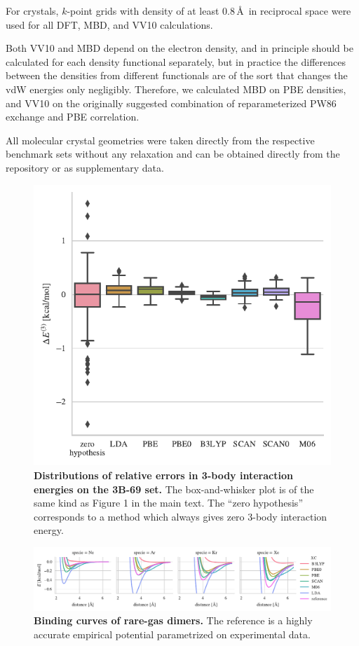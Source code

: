 \documentclass[twocolumn]{article}
\begin{document}
For crystals, $k$-point grids with density of at least 0.8\,\AA\ in reciprocal space were used for all DFT, MBD, and VV10 calculations.

Both VV10 and MBD depend on the electron density, and in principle should be calculated for each density functional separately, but in practice the differences between the densities from different functionals are of the sort that changes the vdW energies only negligibly.
Therefore, we calculated MBD on PBE densities, and VV10 on the originally suggested combination of reparameterized PW86 exchange and PBE correlation.

All molecular crystal geometries were taken directly from the respective benchmark sets without any relaxation and can be obtained directly from the repository or as supplementary data.

\begin{figure}
\includegraphics[center]{../media/3-body}
\caption{\textbf{Distributions of relative errors in 3-body interaction energies on the 3B-69 set.}
The box-and-whisker plot is of the same kind as Figure 1 in the main text.
The ``zero hypothesis'' corresponds to a method which always gives zero 3-body interaction energy.
}\label{fig:3-body}
\end{figure}

\begin{figure}
\includegraphics[center]{../media/mbd-rare-gas}
\caption{\textbf{Binding curves of rare-gas dimers.}
The reference is a highly accurate empirical potential parametrized on experimental data.
}\label{fig:mbd-rare-gas}
\end{figure}
\end{document}
